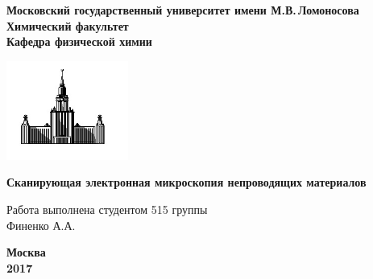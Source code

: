 \documentclass[12pt]{article}
\begin{document}
 

\begin{titlepage}
\centering
\textbf{\large Московский государственный университет имени М.В.\,Ломоносова\\
\vspace*{0.1cm} Химический факультет\\
\vspace*{0.1cm}
\noindent\makebox[\linewidth]{\rule{\paperwidth}{0.4pt}}
\vspace*{0.1cm}
 Кафедра физической химии}
\vspace*{2cm}

\begin{center}
\includegraphics[width=0.3\textwidth]{pictures/logo.jpg}
\end{center}

\vspace*{2cm}
\Large \textbf{Сканирующая электронная микроскопия непроводящих материалов}
\vspace*{6cm}

\begin{flushright}
\large Работа выполнена студентом 515 группы\\
Финенко А.А.\\
\end{flushright}
\vfill
\large\textbf{Москва\\ 2017}
\end{titlepage}
\end{document}
